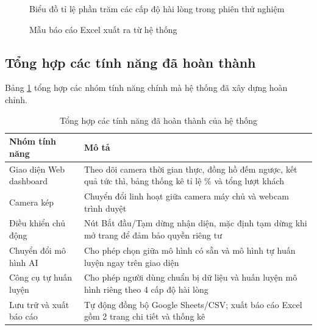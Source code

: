 \documentclass{iaesarticle}
\begin{document}
\begin{figure}[H]
\centering
{}
\vspace{.7em}
\caption{Biểu đồ tỉ lệ phần trăm các cấp độ hài lòng trong phiên thử nghiệm}
\end{figure}

\begin{figure}[H]
\centering
{}
\vspace{.7em}
\caption{Mẫu báo cáo Excel xuất ra từ hệ thống}
\end{figure}

\subsection{Tổng hợp các tính năng đã hoàn thành}
Bảng \ref{tab:tinhnang} tổng hợp các nhóm tính năng chính mà hệ thống đã xây dựng hoàn chỉnh.

\begin{table}[H]
	\centering
	\fontsize{8pt}{10pt}\selectfont
	\caption{Tổng hợp các tính năng đã hoàn thành của hệ thống}
	\label{tab:tinhnang}
	\begin{tabular}{p{3.5cm}p{8.5cm}}
		\hline
		Nhóm tính năng & Mô tả \\
		\hline
		Giao diện Web dashboard & Theo dõi camera thời gian thực, đồng hồ đếm ngược, kết quả tức thì, bảng thống kê tỉ lệ \% và tổng lượt khách \\
		Camera kép & Chuyển đổi linh hoạt giữa camera máy chủ và webcam trình duyệt \\
		Điều khiển chủ động & Nút Bắt đầu/Tạm dừng nhận diện, mặc định tạm dừng khi mở trang để đảm bảo quyền riêng tư \\
		Chuyển đổi mô hình AI & Cho phép chọn giữa mô hình có sẵn và mô hình tự huấn luyện ngay trên giao diện \\
		Công cụ tự huấn luyện & Cho phép người dùng chuẩn bị dữ liệu và huấn luyện mô hình riêng theo 4 cấp độ hài lòng \\
		Lưu trữ và xuất báo cáo & Tự động đồng bộ Google Sheets/CSV; xuất báo cáo Excel gồm 2 trang chi tiết và thống kê \\
		\hline
	\end{tabular}
\end{table}
\end{document}
